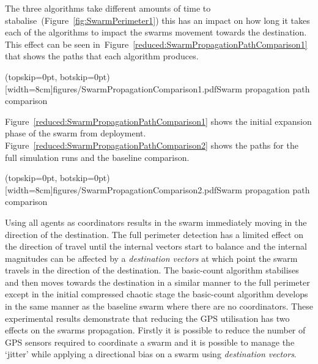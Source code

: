 \documentclass{ieeeaccess}
\begin{document}
The three algorithms take different amounts of time to stabalise~(Figure~\ref{fig:SwarmPerimeter1}) this has an impact on how long it takes each of the algorithms to impact the swarms movement towards the destination. This effect can be seen in~Figure~\ref{reduced:SwarmPropagationPathComparison1} that shows the paths that each algorithm produces. 


\Figure[t!](topskip=0pt, botskip=0pt)[width=8cm]{figures/SwarmPropagationComparison1.pdf}{Swarm propagation path comparison\label{reduced:SwarmPropagationPathComparison1}}

Figure~\ref{reduced:SwarmPropagationPathComparison1} shows the initial expansion phase of the swarm from deployment. Figure~\ref{reduced:SwarmPropagationPathComparison2} shows the paths for the full simulation runs and the baseline comparison.


\Figure[t!](topskip=0pt, botskip=0pt)[width=8cm]{figures/SwarmPropagationComparison2.pdf}{Swarm propagation path comparison\label{reduced:SwarmPropagationPathComparison2}}

Using all agents as coordinators results in the swarm immediately moving in the direction of the destination. The full perimeter detection has a limited effect on the direction of travel until the internal vectors start to balance and the internal magnitudes can be affected by a \textit{destination vectors} at which point the swarm travels in the direction of the destination. The basic-count algorithm stabilises and then moves towards the destination in a similar manner to the full perimeter except in the initial compressed chaotic stage the basic-count algorithm develops in the same manner as the baseline swarm where there are no coordinators. These experimental results demonstrate that reducing the GPS utilisation has two effects on the swarms propagation. Firstly it is possible to reduce the number of GPS sensors required to coordinate a swarm and it is possible to manage the `jitter' while applying a directional bias on a swarm using \textit{destination vectors}. 
\end{document}

